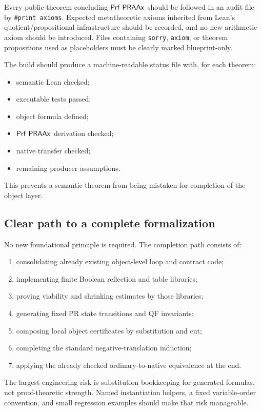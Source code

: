 Every public theorem concluding \(\Prf\ \PRAAx\) should be followed in an audit file by \texttt{\#print axioms}.  Expected metatheoretic axioms inherited from Lean's quotient/propositional infrastructure should be recorded, and no new arithmetic axiom should be introduced.  Files containing \texttt{sorry}, \texttt{axiom}, or theorem propositions used as placeholders must be clearly marked blueprint-only.

The build should produce a machine-readable status file with, for each theorem:

\begin{itemize}
\item semantic Lean checked;
\item executable tests passed;
\item object formula defined;
\item \(\Prf\ \PRAAx\) derivation checked;
\item native transfer checked;
\item remaining producer assumptions.
\end{itemize}

This prevents a semantic theorem from being mistaken for completion of the object layer.

\subsection{Clear path to a complete formalization}

No new foundational principle is required.  The completion path consists of:

\begin{enumerate}
\item consolidating already existing object-level loop and contract code;
\item implementing finite Boolean reflection and table libraries;
\item proving viability and shrinking estimates by those libraries;
\item generating fixed PR state transitions and QF invariants;
\item composing local object certificates by substitution and cut;
\item completing the standard negative-translation induction;
\item applying the already checked ordinary-to-native equivalence at the end.
\end{enumerate}

The largest engineering risk is substitution bookkeeping for generated formulas, not proof-theoretic strength.  Named instantiation helpers, a fixed variable-order convention, and small regression examples should make that risk manageable.
